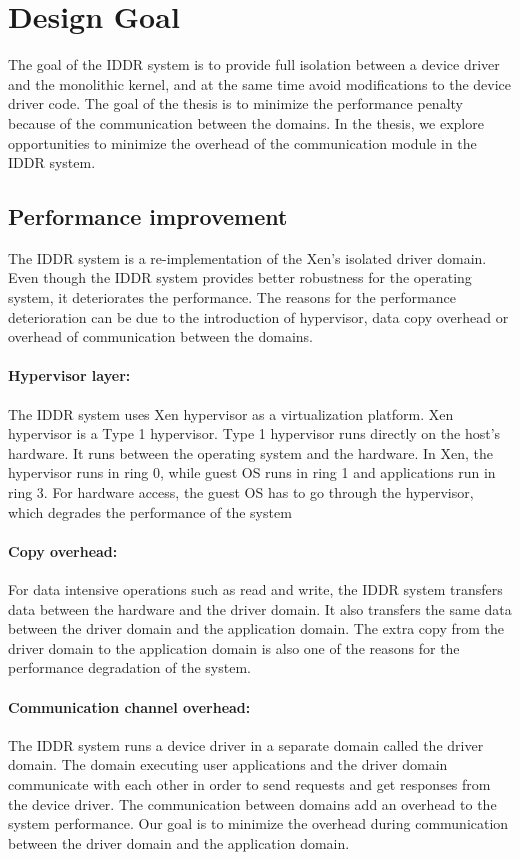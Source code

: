 \section{Design Goal}\label{sec:goals}
The goal of the IDDR system is to provide full isolation between a device driver and the monolithic kernel, and at the same time avoid modifications to the device driver code. The goal of the thesis is to minimize the performance penalty because of the communication between the domains. In the thesis, we explore opportunities to minimize the overhead of the communication module in the IDDR system.

\subsection*{Performance improvement}
The IDDR system is a re-implementation of the Xen's isolated driver domain. Even though the IDDR system provides better robustness for the operating system, it deteriorates the performance. The reasons for the performance deterioration can be due to the introduction of hypervisor, data copy overhead or overhead of communication between the domains. 

\paragraph{Hypervisor layer: } The IDDR system uses Xen hypervisor as a virtualization platform. Xen hypervisor is a Type 1 hypervisor. Type 1 hypervisor runs directly on the host's hardware. It runs between the operating system and the hardware. In Xen, the hypervisor runs in ring 0, while guest OS runs in ring 1 and applications run in ring 3. For hardware access, the guest OS has to go through the hypervisor, which degrades the performance of the system

\paragraph{Copy overhead: } For data intensive operations such as read and write, the IDDR system transfers data between the hardware and the driver domain. It also transfers the same data between the driver domain and the application domain. The extra copy from the driver domain to the application domain is also one of the reasons for the performance degradation of the system. 

\paragraph{Communication channel overhead: } The IDDR system runs a device driver in a separate domain called the driver domain. The domain executing user applications and the driver domain communicate with each other in order to send requests and get responses from the device driver. The communication between domains add an overhead to the system performance. Our goal is to minimize the overhead during communication between the driver domain and the application domain.

